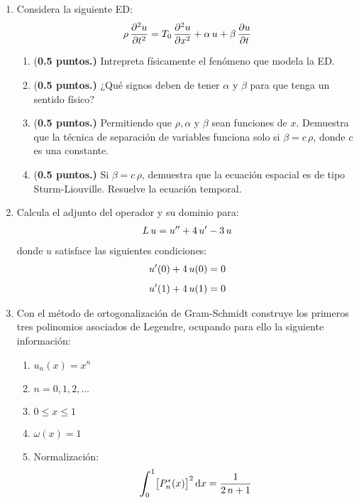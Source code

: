 \begin{enumerate}
\item Considera la siguiente ED:
\begin{align*}
\rho \, \pdv[2]{u}{t} = T_{0} \, \pdv[2]{u}{x} + \alpha \, u + \beta \, \pdv{u}{t}
\end{align*}
\begin{enumerate}
\item (\textbf{0.5 puntos.)} Intrepreta físicamente el fenómeno que modela la ED.
\item (\textbf{0.5 puntos.)} ¿Qué signos deben de tener $\alpha$ y $\beta$ para que tenga un sentido físico?
\item (\textbf{0.5 puntos.)} Permitiendo que $\rho, \alpha$ y $\beta$ sean funciones de $x$. Demuestra que la técnica de separación de variables funciona solo si $\beta = c \, \rho$, donde $c$ es una constante.
\item (\textbf{0.5 puntos.)} Si $\beta = c \, \rho$, demuestra que la ecuación espacial es de tipo Sturm-Liouville. Resuelve la ecuación temporal.
\end{enumerate}
\item Calcula el adjunto del operador y su dominio para:
\begin{align*}
L \, u = {u}^{\prime \prime} +  4 \, {u}^{\prime} - 3 \, u
\end{align*}
donde $u$ satisface las siguientes condiciones:
\begin{align*}
{u}^{\prime}(0) + 4 \, u(0) &= 0 \\[0.5em]
{u}^{\prime}(1) + 4 \, u(1) &= 0
\end{align*}
\item Con el método de ortogonalización de Gram-Schmidt construye los primeros tres polinomios asociados de Legendre, ocupando para ello la siguiente información:
\begin{enumerate}[label=\alph*)]
\item $u_{n}(x) = x^{n}$
\item $n = 0, 1, 2, \ldots$
\item $0 \leq x \leq 1$
\item $\omega (x) = 1$
\item Normalización:
\begin{align*}
\scaleint{6ex}_{\bs 0}^{1} \big[ P_{n}^{*} (x) \big]^{2} \dd{x} = \dfrac{1}{2 \, n + 1}
\end{align*}
\end{enumerate} 

\end{enumerate}
